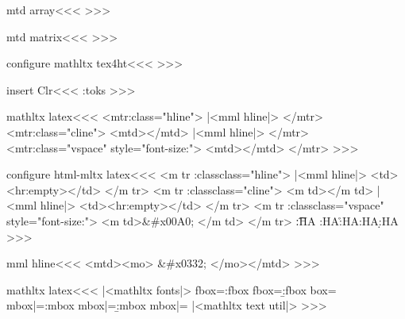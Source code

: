 {{\<mtd array\><<<
%
>>>

\<mtd matrix\><<<
%
>>>

\<configure mathltx tex4ht\><<<
>>>


\<insert Clr\><<<
\expandafter\tmp:toks\expandafter{\Clr}%
\HCode{<!---->}%
>>>





\<mathltx latex\><<<
\def\:MM{m}
   {<mtr\Hnewline \mml:class="hline">} 
   {|<mml hline|>}
   {</mtr>}
   {<mtr\Hnewline \mml:class="cline">}
   {<mtd></mtd>}
   {|<mml hline|>}
   {</mtr>}
   {<mtr\Hnewline \mml:class="vspace" style="font-size:\HBorderspace">}
   {<mtd\Hnewline></mtd>}
   {</mtr>}
>>>

\<configure html-mltx latex\><<<
\def\:MM{\ifmathltx m\fi}
   {<\:MM tr\Hnewline 
       \ifmathltx \expandafter\mml:class\else class\fi="hline">} 
   {\ifmathltx|<mml hline|>\else
            <td><hr\xml:empty></td>\fi} 
   {</\:MM tr>}
   {<\:MM tr\Hnewline
       \ifmathltx \expandafter\mml:class\else class\fi ="cline">}
   {<\:MM td></\:MM td>}
   {\ifmathltx|<mml hline|>\else
            <td><hr\xml:empty></td>\fi}
   {</\:MM tr>}
   {<\:MM tr\Hnewline
         \ifmathltx \expandafter\mml:class\else  class\fi="vspace"
         style="font-size:\HBorderspace">}
   {<\:MM td\Hnewline>\ifmathltx\else\string&\#x00A0;\fi
      </\:MM td>}
   {</\:MM tr>}
   {\EndP{}}   \t:HA
   \R:HA\r:HA\D:HA\d:HA
>>>



\<mml hline\><<<
<mtd><mo> \string&\#x0332; </mo></mtd>
>>>




\<mathltx latex\><<<
|<mathltx fonts|>
\let\A:fbox=\a:fbox
\let\B:fbox=\b:fbox
\let\OLDf:box=\fbox
\def\fbox{\relax\ifmmode
    \Configure{fbox}{\leavevmode\Configure{HtmlPar}{}{}{}{}\IgnoreRule
                     \AA:text{fbox}}{\BB:text\EndIgnoreRule}\else
    \Configure{fbox}{\leavevmode
                     \IgnoreRule\A:fbox}{\B:fbox\EndIgnoreRule}\fi
    \OLDf:box}
\let\A:mbox|=\a:mbox
\let\B:mbox|=\b:mbox
\let\OLD:mbox|=\mbox
\def\mbox{\relax\ifmmode \Configure{mbox}{\AA:text{mbox}}{\BB:text}\else
                   \Configure{mbox}{\A:mbox}{\B:mbox}\fi\OLD:mbox}
|<mathltx text util|>
>>>


}}
